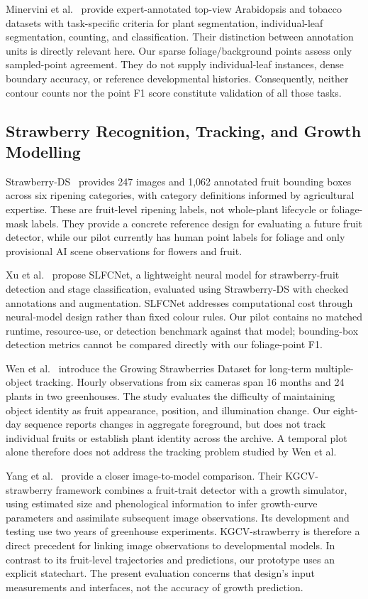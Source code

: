 \documentclass[runningheads]{llncs}
\begin{document}
Minervini et al.~\cite{minervini2016} provide expert-annotated top-view Arabidopsis and tobacco datasets with task-specific criteria for plant segmentation, individual-leaf segmentation, counting, and classification. Their distinction between annotation units is directly relevant here. Our sparse foliage/background points assess only sampled-point agreement. They do not supply individual-leaf instances, dense boundary accuracy, or reference developmental histories. Consequently, neither contour counts nor the point F1 score constitute validation of all those tasks.

\subsection{Strawberry Recognition, Tracking, and Growth Modelling}
Strawberry-DS~\cite{elhariri2023} provides 247 images and 1,062 annotated fruit bounding boxes across six ripening categories, with category definitions informed by agricultural expertise. These are fruit-level ripening labels, not whole-plant lifecycle or foliage-mask labels. They provide a concrete reference design for evaluating a future fruit detector, while our pilot currently has human point labels for foliage and only provisional AI scene observations for flowers and fruit.

Xu et al.~\cite{xu2025} propose SLFCNet, a lightweight neural model for strawberry-fruit detection and stage classification, evaluated using Strawberry-DS with checked annotations and augmentation. SLFCNet addresses computational cost through neural-model design rather than fixed colour rules. Our pilot contains no matched runtime, resource-use, or detection benchmark against that model; bounding-box detection metrics cannot be compared directly with our foliage-point F1.

Wen et al.~\cite{wen2024} introduce the Growing Strawberries Dataset for long-term multiple-object tracking. Hourly observations from six cameras span 16 months and 24 plants in two greenhouses. The study evaluates the difficulty of maintaining object identity as fruit appearance, position, and illumination change. Our eight-day sequence reports changes in aggregate foreground, but does not track individual fruits or establish plant identity across the archive. A temporal plot alone therefore does not address the tracking problem studied by Wen et al.

Yang et al.~\cite{yang2024} provide a closer image-to-model comparison. Their KGCV-strawberry framework combines a fruit-trait detector with a growth simulator, using estimated size and phenological information to infer growth-curve parameters and assimilate subsequent image observations. Its development and testing use two years of greenhouse experiments. KGCV-strawberry is therefore a direct precedent for linking image observations to developmental models. In contrast to its fruit-level trajectories and predictions, our prototype uses an explicit statechart. The present evaluation concerns that design's input measurements and interfaces, not the accuracy of growth prediction.
\end{document}
